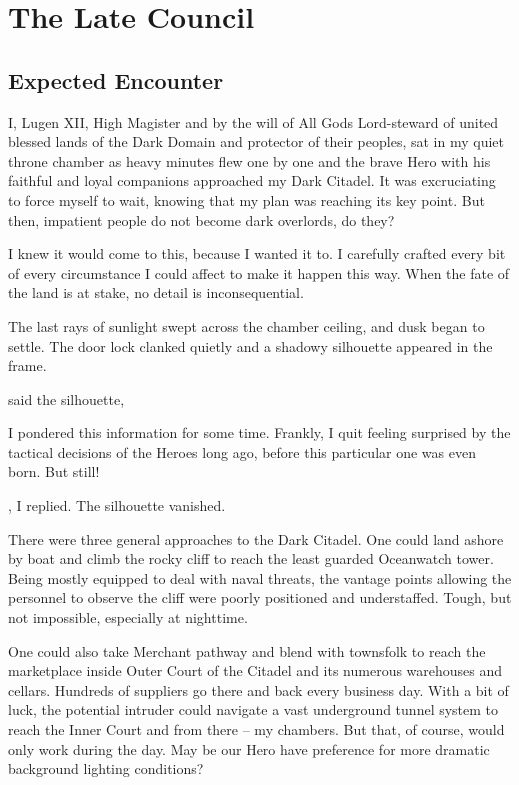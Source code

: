 \chapter{The Late Council}

\section{Expected Encounter}

I, Lugen XII, High Magister and by the will of All Gods Lord-steward of united blessed lands of the Dark Domain and protector of their peoples, sat in my quiet throne chamber as heavy minutes flew one by one and the brave Hero with his faithful and loyal companions approached my Dark Citadel. It was excruciating to force myself to wait, knowing that my plan was reaching its key point. But then, impatient people do not become dark overlords, do they?

I knew it would come to this, because I wanted it to. I carefully crafted every bit of every circumstance I could affect to make it happen this way. When the fate of the land is at stake, no detail is inconsequential.

The last rays of sunlight swept across the chamber ceiling, and dusk began to settle. The door lock clanked quietly and a shadowy silhouette appeared in the frame.

 said the silhouette, 

I pondered this information for some time. Frankly, I quit feeling surprised by the tactical decisions of the Heroes long ago, before this particular one was even born. But still!

, I replied.  The silhouette vanished.

There were three general approaches to the Dark Citadel. One could land ashore by boat and climb the rocky cliff to reach the least guarded Oceanwatch tower. Being mostly equipped to deal with naval threats, the vantage points allowing the personnel to observe the cliff were poorly positioned and understaffed. Tough, but not impossible, especially at nighttime.

One could also take Merchant pathway and blend with townsfolk to reach the marketplace inside Outer Court of the Citadel and its numerous warehouses and cellars. Hundreds of suppliers go there and back every business day. With a bit of luck, the potential intruder could navigate a vast underground tunnel system to reach the Inner Court and from there -- my chambers. But that, of course, would only work during the day. May be our Hero have preference for more dramatic background lighting conditions?

